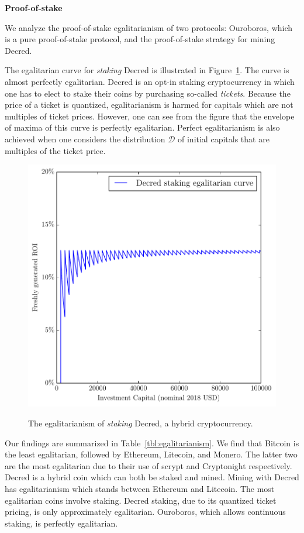 
\noindent\textbf{Proof-of-stake}

\noindent
We analyze the proof-of-stake egalitarianism of two protocols: Ouroboros,
which is a pure proof-of-stake protocol, and the proof-of-stake strategy
for mining Decred.

The egalitarian curve for \emph{staking} Decred is illustrated in
Figure~\ref{fig:decred-stake}. The curve is almost perfectly egalitarian. Decred
is an opt-in staking cryptocurrency in which one has to elect to stake their
coins by purchasing so-called \emph{tickets}. Because the price of a ticket is
quantized, egalitarianism is harmed for capitals which are not multiples of
ticket prices. However, one can see from the figure that the envelope of maxima
of this curve is perfectly egalitarian. Perfect egalitarianism is also achieved
when one considers the distribution $\mathcal{D}$ of initial capitals that are
multiples of the ticket price.

\begin{figure}[H]
    \caption{The egalitarianism of \emph{staking} Decred, a hybrid cryptocurrency.}
    \centering
    \includegraphics[width=0.75 \columnwidth,keepaspectratio]{figures/decred-stake.pdf}
    \label{fig:decred-stake}
\end{figure}


Our findings are summarized in Table~\ref{tbl:egalitarianism}. We find that
Bitcoin is the least egalitarian, followed by Ethereum, Litecoin, and Monero.
The latter two are the most egalitarian due to their use of scrypt and
Cryptonight respectively. Decred is a hybrid coin which can both be staked and
mined. Mining with Decred has egalitarianism which stands between Ethereum and
Litecoin. The most egalitarian coins involve staking. Decred staking, due to its
quantized ticket pricing, is only approximately egalitarian. Ouroboros, which
allows continuous staking, is perfectly egalitarian.

